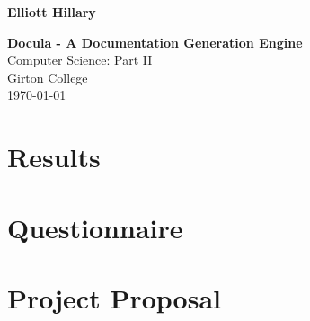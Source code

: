 \documentclass[twoside,12pt,notitlepage]{Classes/CUEDthesisPSnPDF}
\begin{document}
\pagestyle{empty}

\hfill{\LARGE \bf Elliott Hillary}

\vspace*{60mm}
\begin{center}
\Huge
{\bf Docula - A Documentation Generation Engine} \\
\vspace*{5mm}
Computer Science: Part II\\
\vspace*{5mm}
Girton College \\
\vspace*{5mm}
\today  %
\end{center}

\setcounter{secnumdepth}{3}
\setcounter{tocdepth}{3}

\frontmatter %
\cleardoublepage

\cleardoublepage


\begingroup
\hypersetup{linkcolor=black}
\tableofcontents
\endgroup

\mainmatter %
\pagestyle{fancy}






\printbibliography

\begin{appendices}
\chapter{Results}


\chapter{Questionnaire}

\chapter{Project Proposal}

\end{appendices}
\end{document}

